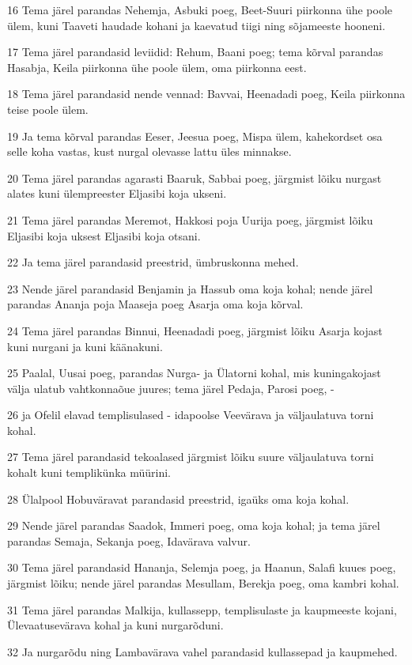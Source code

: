 \par 16 Tema järel parandas Nehemja, Asbuki poeg, Beet-Suuri piirkonna ühe poole ülem, kuni Taaveti haudade kohani ja kaevatud tiigi ning sõjameeste hooneni.
\par 17 Tema järel parandasid leviidid: Rehum, Baani poeg; tema kõrval parandas Hasabja, Keila piirkonna ühe poole ülem, oma piirkonna eest.
\par 18 Tema järel parandasid nende vennad: Bavvai, Heenadadi poeg, Keila piirkonna teise poole ülem.
\par 19 Ja tema kõrval parandas Eeser, Jeesua poeg, Mispa ülem, kahekordset osa selle koha vastas, kust nurgal olevasse lattu üles minnakse.
\par 20 Tema järel parandas agarasti Baaruk, Sabbai poeg, järgmist lõiku nurgast alates kuni ülempreester Eljasibi koja ukseni.
\par 21 Tema järel parandas Meremot, Hakkosi poja Uurija poeg, järgmist lõiku Eljasibi koja uksest Eljasibi koja otsani.
\par 22 Ja tema järel parandasid preestrid, ümbruskonna mehed.
\par 23 Nende järel parandasid Benjamin ja Hassub oma koja kohal; nende järel parandas Ananja poja Maaseja poeg Asarja oma koja kõrval.
\par 24 Tema järel parandas Binnui, Heenadadi poeg, järgmist lõiku Asarja kojast kuni nurgani ja kuni käänakuni.
\par 25 Paalal, Uusai poeg, parandas Nurga- ja Ülatorni kohal, mis kuningakojast välja ulatub vahtkonnaõue juures; tema järel Pedaja, Parosi poeg, -
\par 26 ja Ofelil elavad templisulased - idapoolse Veevärava ja väljaulatuva torni kohal.
\par 27 Tema järel parandasid tekoalased järgmist lõiku suure väljaulatuva torni kohalt kuni templikünka müürini.
\par 28 Ülalpool Hobuväravat parandasid preestrid, igaüks oma koja kohal.
\par 29 Nende järel parandas Saadok, Immeri poeg, oma koja kohal; ja tema järel parandas Semaja, Sekanja poeg, Idavärava valvur.
\par 30 Tema järel parandasid Hananja, Selemja poeg, ja Haanun, Salafi kuues poeg, järgmist lõiku; nende järel parandas Mesullam, Berekja poeg, oma kambri kohal.
\par 31 Tema järel parandas Malkija, kullassepp, templisulaste ja kaupmeeste kojani, Ülevaatusevärava kohal ja kuni nurgarõduni.
\par 32 Ja nurgarõdu ning Lambavärava vahel parandasid kullassepad ja kaupmehed.


